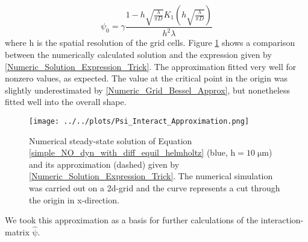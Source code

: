 \documentclass[10pt,a4paper]{article}
\begin{document}
\begin{equation}
\psi_0 = \gamma \frac{1-h\sqrt{\frac{\lambda}{\pi D}} K_1\left( h\sqrt{\frac{\lambda}{\pi D}}\right) }{h^2 \lambda}
\label{Numeric_Grid_Bessel_Approx}
\end{equation}
where $\mathrm{h}$ is the spatial resolution of the grid cells. Figure \ref{Psi_Approximation_Compare} shows a comparison between the numerically calculated solution and the expression given by \ref{Numeric_Solution_Expression_Trick}. The approximation fitted very well for nonzero values, as expected. The value at the critical point in the origin was slightly underestimated by \eqref{Numeric_Grid_Bessel_Approx}, but nonetheless fitted well into the overall shape.
\begin{figure}
\begin{center}
\texttt{[image: ../../plots/Psi\_Interact\_Approximation.png]}
\end{center}
\caption{Numerical steady-state solution of Equation \eqref{simple_NO_dyn_with_diff_equil_helmholtz} (blue, $\mathrm{h=10\;\mu m}$) and its approximation (dashed) given by \eqref{Numeric_Solution_Expression_Trick}. The numerical simulation was carried out on a 2d-grid and the curve represents a cut through the origin in x-direction.}
\label{Psi_Approximation_Compare}
\end{figure}
We took this approximation as a basis for further calculations of the interaction-matrix $\mathrm{\hat{\psi}}$.
\end{document}
